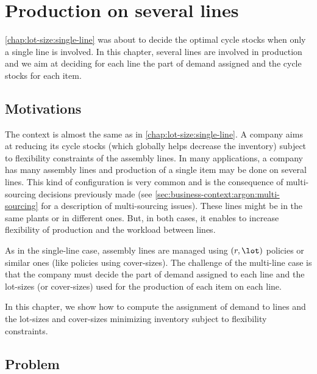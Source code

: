 \chapter{Production on several lines}
\label{chap:lot-size:several-lines}



\cref{chap:lot-size:single-line} was about to decide the optimal cycle stocks when only a single line is involved.
In this chapter, several lines are involved in production and we aim at deciding for each line the part of demand assigned and the cycle stocks for each item.



\section{Motivations}
\label{sec:lot-size:several-lines:motivations}


The context is almost the same as in \cref{chap:lot-size:single-line}.
A company aims at reducing its cycle stocks (which globally helps decrease the inventory) subject to flexibility constraints of the assembly lines.
In many applications, a company has many assembly lines and production of a single item may be done on several lines.
This kind of configuration is very common and is the consequence of multi-sourcing decisions previously made (see \cref{sec:business-context:argon:multi-sourcing} for a description of multi-sourcing issues).
These lines might be in the same plants or in different ones.
But, in both cases, it enables to increase flexibility of production and the workload between lines.


As in the single-line case, assembly lines are managed using $(r,\lot)$ policies or similar ones (like policies using cover-sizes).
The challenge of the multi-line case is that the company must decide the part of demand assigned to each line and the lot-sizes (or cover-sizes) used for the production of each item on each line.


In this chapter, we show how to compute the assignment of demand to lines and the lot-sizes and cover-sizes minimizing inventory subject to flexibility constraints.


\section{Problem}


